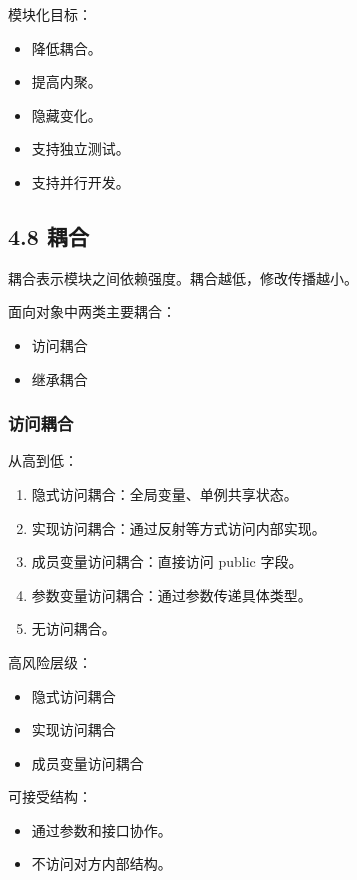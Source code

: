 \documentclass[UTF8,zihao=-4]{ctexart}
\begin{document}
模块化目标：

\begin{itemize}
\item 降低耦合。
\item 提高内聚。
\item 隐藏变化。
\item 支持独立测试。
\item 支持并行开发。
\end{itemize}

\subsection{4.8 耦合}

耦合表示模块之间依赖强度。耦合越低，修改传播越小。

面向对象中两类主要耦合：

\begin{itemize}
\item 访问耦合
\item 继承耦合
\end{itemize}

\subsubsection{访问耦合}

从高到低：

\begin{enumerate}
\item 隐式访问耦合：全局变量、单例共享状态。
\item 实现访问耦合：通过反射等方式访问内部实现。
\item 成员变量访问耦合：直接访问 public 字段。
\item 参数变量访问耦合：通过参数传递具体类型。
\item 无访问耦合。
\end{enumerate}

高风险层级：

\begin{itemize}
\item 隐式访问耦合
\item 实现访问耦合
\item 成员变量访问耦合
\end{itemize}

可接受结构：

\begin{itemize}
\item 通过参数和接口协作。
\item 不访问对方内部结构。
\end{itemize}
\end{document}
